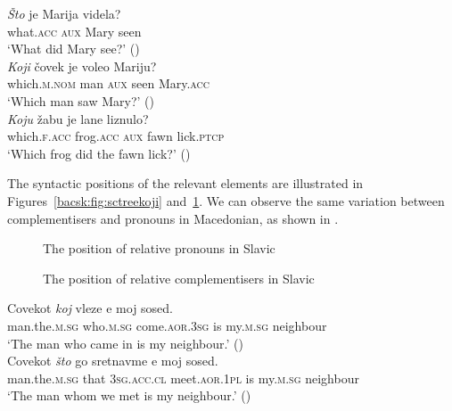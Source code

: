 \documentclass[output=paper]{langscibook}
\begin{document}
\ea \label{bacsk:ex:int}
\ea \gll \textit{Što} je Marija videla?\\
what.\textsc{acc} \textsc{aux} Mary seen\\
\glt `What did Mary see?' \hfill (\citealt[77]{halpern1995})\\
\ex \gll \textit{Koji} čovek je voleo Mariju?\\
which.\textsc{m.nom} man \textsc{aux} seen Mary.\textsc{acc}\\
\glt `Which man saw Mary?' \hfill (\citealt[78]{halpern1995})\\
\ex \gll \textit{Koju} \v{z}abu je lane liznulo?\\
which.\textsc{f.acc} frog.\textsc{acc} \textsc{aux} fawn lick.\textsc{ptcp}\\
\glt `Which frog did the fawn lick?' \hfill (\citealt[34]{kljajevic2012})
\z
\z

\noindent The syntactic positions of the relevant elements are illustrated in Figures~\ref{bacsk:fig:sctreekoji} and~\ref{bacsk:fig:sctreesto}. We can observe the same variation between complementisers and pronouns in Macedonian, as shown in .

\begin{figure}
\begin{floatrow}
\captionsetup{margin=.05\linewidth}
{\caption{The position of relative pronouns in Slavic}\label{bacsk:fig:sctreekoji}}

{\caption{The position of relative complementisers in Slavic}
\label{bacsk:fig:sctreesto}}
\end{floatrow}
\end{figure}

\ea \label{bacsk:ex:macedonianbasic}
\ea \gll Covekot \textit{koj} vleze e moj sosed.\\
man.the.\textsc{m.sg} who.\textsc{m.sg} come.\textsc{aor.3sg} is my.\textsc{m.sg} neighbour\\
\glt `The man who came in is my neighbour.' \hfill (\citealt[232]{buzarovska2009})\\
\ex \gll Covekot \textit{što} go sretnavme e moj sosed.\\
man.the.\textsc{m.sg} that \textsc{3sg.acc.cl} meet.\textsc{aor.1pl} is my.\textsc{m.sg} neighbour\\
\glt `The man whom we met is my neighbour.' \hfill (\citealt[232]{buzarovska2009})
\z
\z
\end{document}
